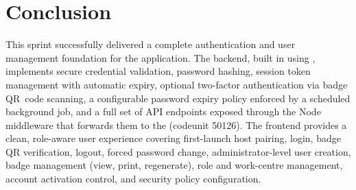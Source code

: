 \section*{Conclusion}

This sprint successfully delivered a complete authentication and user management
foundation for the  application. The backend, built in
 using , implements
secure credential validation,  password hashing,
session token management with automatic expiry, optional two-factor authentication
via badge QR~code scanning, a configurable password expiry policy enforced by a
scheduled background job, and a full set of
 API endpoints exposed through the Node middleware that forwards them to the 
(codeunit 50126). The  frontend provides a clean, role-aware
user experience covering first-launch host pairing, login, badge QR verification,
logout, forced password change, administrator-level user creation, badge
management (view, print, regenerate), role and work-centre management, account
activation control, and security policy configuration.
